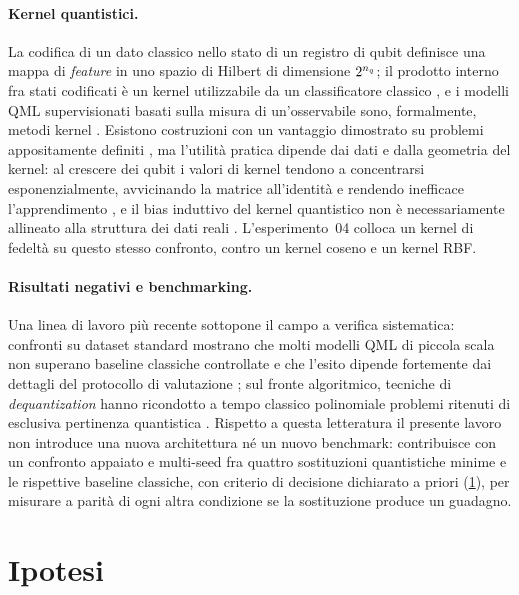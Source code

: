 \paragraph{Kernel quantistici.}
La codifica di un dato classico nello stato di un registro di qubit definisce una
mappa di \emph{feature} in uno spazio di Hilbert di dimensione $2^{n_q}$; il
prodotto interno fra stati codificati è un kernel utilizzabile da un
classificatore classico \parencite{schuld2019quantum,havlicek2019supervised}, e i
modelli QML supervisionati basati sulla misura di un'osservabile sono, formalmente,
metodi kernel \parencite{schuld2021kernel}. Esistono costruzioni con un vantaggio
dimostrato su problemi appositamente definiti \parencite{liu2021rigorous}, ma
l'utilità pratica dipende dai dati \parencite{huang2021power} e dalla geometria del
kernel: al crescere dei qubit i valori di kernel tendono a concentrarsi
esponenzialmente, avvicinando la matrice all'identità e rendendo inefficace
l'apprendimento \parencite{thanasilp2024concentration}, e il bias induttivo del
kernel quantistico non è necessariamente allineato alla struttura dei dati reali
\parencite{kubler2021inductive}. L'esperimento~04 colloca un kernel di fedeltà su
questo stesso confronto, contro un kernel coseno e un kernel RBF.

\paragraph{Risultati negativi e benchmarking.}
Una linea di lavoro più recente sottopone il campo a verifica sistematica:
confronti su dataset standard mostrano che molti modelli QML di piccola scala non
superano baseline classiche controllate e che l'esito dipende fortemente dai
dettagli del protocollo di valutazione \parencite{bowles2024benchmarking}; sul
fronte algoritmico, tecniche di \emph{dequantization} hanno ricondotto a tempo
classico polinomiale problemi ritenuti di esclusiva pertinenza quantistica
\parencite{tang2019quantum}. Rispetto a questa letteratura il presente lavoro non
introduce una nuova architettura né un nuovo benchmark: contribuisce con un
confronto appaiato e multi-seed fra quattro sostituzioni quantistiche minime e le
rispettive baseline classiche, con criterio di decisione dichiarato a priori
(\cref{sec:ipotesi}), per misurare a parità di ogni altra condizione se la
sostituzione produce un guadagno.

\section{Ipotesi}
\label{sec:ipotesi}

